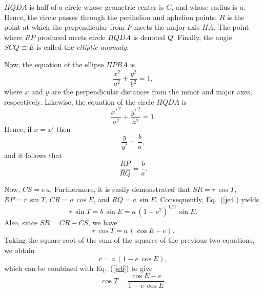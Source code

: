 $\Pi QDA$ is half of a circle whose geometric center is $C$, and whose
radius is $a$. Hence, the circle passes through the perihelion and aphelion
points. $R$ is the point at which the perpendicular from $P$ 
meets the major axis $\Pi A$. The point where $RP$ produced
meets circle $\Pi QDA$ is denoted $Q$. Finally,
the angle $SCQ\equiv E$ is called the {\em elliptic anomaly}. 

Now, the equation of the ellipse $\Pi PBA$ is
\begin{equation}
\frac{x^2}{a^2}+ \frac{y^2}{b^2} = 1,
\end{equation}
where $x$ and $y$ are the perpendicular distances from the minor and major
axes, respectively. Likewise, the equation of the circle $\Pi QDA$ is
\begin{equation}
\frac{x'^{\,2}}{a^2} + \frac{y'^{\,2}}{a^2} = 1.
\end{equation}
Hence, if $x=x'$ then
\begin{equation}
\frac{y}{y'} = \frac{b}{a},
\end{equation}
and it follows that
\begin{equation}\label{je4}
\frac{RP}{RQ} = \frac{b}{a}.
\end{equation}

Now, $CS = e\,a$. Furthermore, it is easily demonstrated that
 $SR=r\,\cos T$, $RP=r\,\sin T$, $CR= a\,\cos E$, and $RQ= a\,\sin E$. Consequently, Eq.~(\ref{je4}) yields
\begin{equation}\label{je5}
r\,\sin T = b\,\sin E = a\,(1-e^2)^{1/2}\,\sin E.
\end{equation}
Also, since $SR = CR-CS$, we have
\begin{equation}\label{je6}
r\,\cos T = a\,(\cos E - e).
\end{equation}
Taking the square root of the sum of the squares of the previous two equations, we obtain
\begin{equation}\label{je7}
r = a\,(1-e\,\cos E),
\end{equation}
which can be combined with Eq.~(\ref{je6}) to give
\begin{equation}
\cos T = \frac{\cos E - e}{1-e\,\cos E}.
\end{equation}

